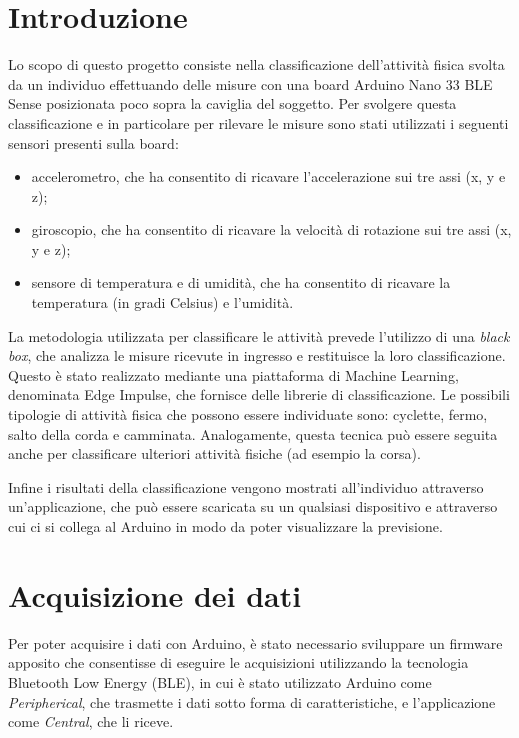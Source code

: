 \section{Introduzione}
Lo scopo di questo progetto consiste nella classificazione dell'attività fisica svolta da un individuo effettuando delle misure con una board Arduino Nano 33 BLE Sense posizionata poco sopra la caviglia del soggetto. Per svolgere questa classificazione e in particolare per rilevare le misure sono stati utilizzati i seguenti sensori presenti sulla board:
\begin{itemize}
	\item accelerometro, che ha consentito di ricavare l'accelerazione sui tre assi (x, y e z);
	\item giroscopio, che ha consentito di ricavare la velocità di rotazione sui tre assi (x, y e z);
	\item sensore di temperatura e di umidità, che ha consentito di ricavare la temperatura (in gradi Celsius) e l'umidità.
\end{itemize}

La metodologia utilizzata per classificare le attività prevede l'utilizzo di una \textit{black box}, che analizza le misure ricevute in ingresso e restituisce la loro classificazione. Questo è stato realizzato mediante una piattaforma di Machine Learning, denominata Edge Impulse, che fornisce delle librerie di classificazione. Le possibili tipologie di attività fisica che possono essere individuate sono: cyclette, fermo, salto della corda e camminata. Analogamente, questa tecnica può essere seguita anche per classificare ulteriori attività fisiche (ad esempio la corsa).

Infine i risultati della classificazione vengono mostrati all'individuo attraverso un'applicazione, che può essere scaricata su un qualsiasi dispositivo e attraverso cui ci si collega al Arduino in modo da poter visualizzare la previsione.

\section{Acquisizione dei dati}
Per poter acquisire i dati con Arduino, è stato necessario sviluppare un firmware apposito che consentisse di eseguire le acquisizioni utilizzando la tecnologia Bluetooth Low Energy (BLE), in cui è stato utilizzato Arduino come \textit{Peripherical}, che trasmette i dati sotto forma di caratteristiche, e l'applicazione come \textit{Central}, che li riceve. 

